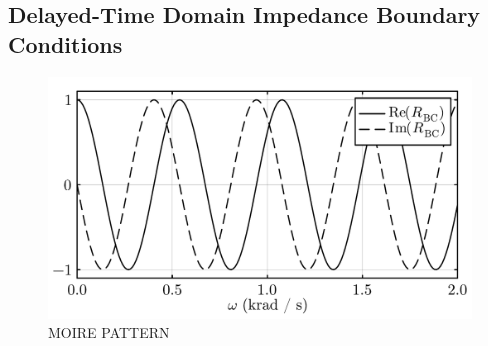 













\subsection{Delayed-Time Domain Impedance Boundary Conditions}




\begin{figure}[t]
\centering
\includegraphics[scale=0.35]{assets/graphs/complex_R_Moire.pdf}
\caption{MOIRE PATTERN}
\label{fig:moire}
\end{figure}

